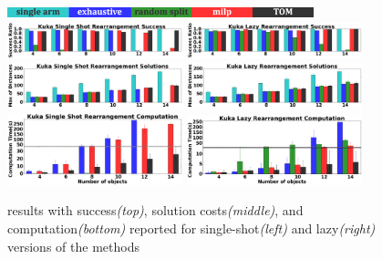 \begin{figure}[h]
\vspace{-0.2in}
	\centering
	\includegraphics[width=3.5in]{figures/results/labels}
	\includegraphics[width=2in]{figures/results/2_kuka_ms_success}
	\includegraphics[width=2in]{figures/results/1_kuka_lazy_ms_success}
	\includegraphics[width=2in]{figures/results/2_kuka_ms_cost}
	\includegraphics[width=2in]{figures/results/1_kuka_lazy_ms_cost}
	\includegraphics[width=2in]{figures/results/2_kuka_ms_time}
	\includegraphics[width=2in]{figures/results/1_kuka_lazy_ms_time}
	\vspace{-0.15in}
    \caption{\textit{\kuka}results with success\textit{(top)}, solution costs\textit{(middle)}, and computation\textit{(bottom)} reported for single-shot\textit{(left)} and lazy\textit{(right)} versions of the methods}
    \vspace{-0.3in}
	\label{fig:kuka}
\end{figure}

